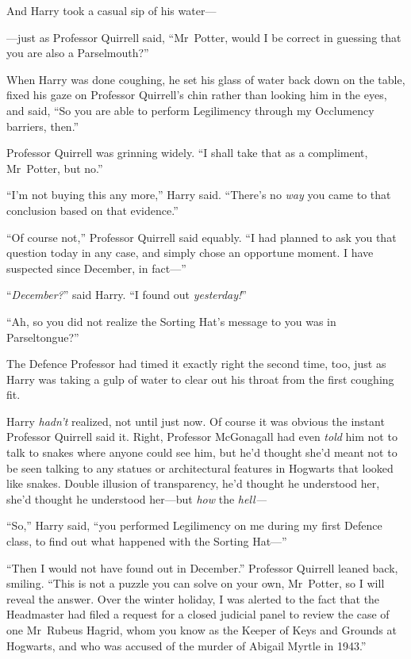 And Harry took a casual sip of his water—

—just as Professor Quirrell said, “Mr~Potter, would I be correct in guessing that you are also a Parselmouth?”

When Harry was done coughing, he set his glass of water back down on the table, fixed his gaze on Professor Quirrell’s chin rather than looking him in the eyes, and said, “So you are able to perform Legilimency through my Occlumency barriers, then.”

Professor Quirrell was grinning widely. “I shall take that as a compliment, Mr~Potter, but no.”

“I’m not buying this any more,” Harry said. “There’s no \emph{way} you came to that conclusion based on that evidence.”

“Of course not,” Professor Quirrell said equably. “I had planned to ask you that question today in any case, and simply chose an opportune moment. I have suspected since December, in fact—”

“\emph{December?}” said Harry. “I found out \emph{yesterday!}”

“Ah, so you did not realize the Sorting Hat’s message to you was in Parseltongue?”

The Defence Professor had timed it exactly right the second time, too, just as Harry was taking a gulp of water to clear out his throat from the first coughing fit.

Harry \emph{hadn’t} realized, not until just now. Of course it was obvious the instant Professor Quirrell said it. Right, Professor McGonagall had even \emph{told} him not to talk to snakes where anyone could see him, but he’d thought she’d meant not to be seen talking to any statues or architectural features in Hogwarts that looked like snakes. Double illusion of transparency, he’d thought he understood her, she’d thought he understood her—but \emph{how} the \emph{hell—}

“So,” Harry said, “you performed Legilimency on me during my first Defence class, to find out what happened with the Sorting Hat—”

“Then I would not have found out in December.” Professor Quirrell leaned back, smiling. “This is not a puzzle you can solve on your own, Mr~Potter, so I will reveal the answer. Over the winter holiday, I was alerted to the fact that the Headmaster had filed a request for a closed judicial panel to review the case of one Mr~Rubeus Hagrid, whom you know as the Keeper of Keys and Grounds at Hogwarts, and who was accused of the murder of Abigail Myrtle in 1943.”

